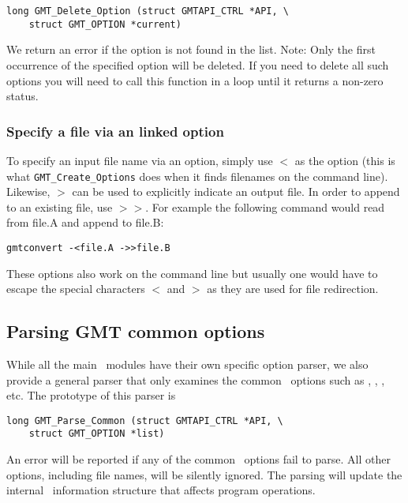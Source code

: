 \documentclass{report}
\begin{document}
\begin{verbatim}
long GMT_Delete_Option (struct GMTAPI_CTRL *API, \
    struct GMT_OPTION *current)
\end{verbatim}
We return an error if the option is not found in the list.  Note: Only the first
occurrence of the specified option will be deleted.  If you need to delete all such
options you will need to call this function in a loop until it returns a non-zero
status.

\subsubsection{Specify a file via an linked option}

To specify an input file name via an option, simply use $<$ as the option (this is what
\texttt{GMT\_Create\_Options} does when it finds filenames on the command line).
Likewise, $>$ can be used to explicitly indicate an output file.  In order to append to
an existing file, use $>>$.  For example the following command would read from file.A
and append to file.B:

\begin{verbatim}
gmtconvert -<file.A ->>file.B
\end{verbatim}

These options also work on the command line but usually one would have to escape the
special characters $<$ and $>$ as they are used for file redirection.

\subsection{Parsing GMT common options}

While all the main \GMT\ modules have their own specific option parser, we also provide a general
parser that only examines the common \GMT\ options such as \Opt{R}, \Opt{J}, \Opt{V}, etc.  The prototype
of this parser is


\begin{verbatim}
long GMT_Parse_Common (struct GMTAPI_CTRL *API, \
    struct GMT_OPTION *list)
\end{verbatim}

An error will be reported if any of the common \GMT\ options fail to parse.  All other options,
including file names, will be silently ignored.  The parsing will update the internal \GMT\
information structure that affects program operations.
\end{document}
